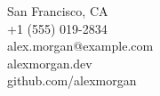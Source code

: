 {\color{textmuted}%
San Francisco, CA\\
+1 (555) 019-2834\\
alex.morgan@example.com\\
alexmorgan.dev\\
github.com/alexmorgan}\par

\resumedivider
